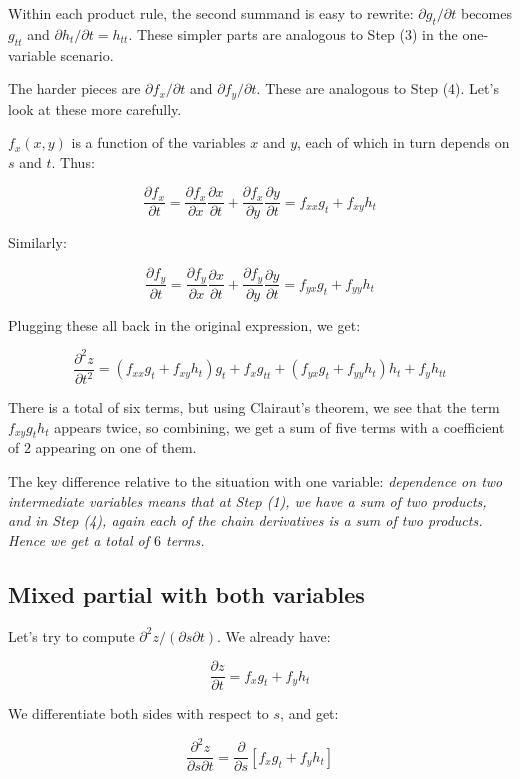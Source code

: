 \documentclass[10pt]{amsart}
\begin{document}
Within each product rule, the second summand is easy to rewrite:
$\partial g_t/\partial t$ becomes $g_{tt}$ and $\partial h_t/\partial
t = h_{tt}$. These simpler parts are analogous to Step (3) in the
one-variable scenario.

The harder pieces are $\partial f_x/\partial t$ and $\partial
f_y/\partial t$. These are analogous to Step (4). Let's look at these
more carefully.

$f_x(x,y)$ is a function of the variables $x$ and $y$, each of which
in turn depends on $s$ and $t$. Thus:

$$\frac{\partial f_x}{\partial t} = \frac{\partial f_x}{\partial x}\frac{\partial x}{\partial t} + \frac{\partial f_x}{\partial y} \frac{\partial y}{\partial t} = f_{xx}g_t + f_{xy}h_t$$

Similarly:

$$\frac{\partial f_y}{\partial t} = \frac{\partial f_y}{\partial x}\frac{\partial x}{\partial t} + \frac{\partial f_y}{\partial y}\frac{\partial y}{\partial t} = f_{yx}g_t + f_{yy}h_t$$

Plugging these all back in the original expression, we get:

$$\frac{\partial^2z}{\partial t^2} = (f_{xx}g_t + f_{xy}h_t)g_t + f_xg_{tt} + (f_{yx}g_t + f_{yy}h_t)h_t + f_yh_{tt}$$

There is a total of six terms, but using Clairaut's theorem, we see
that the term $f_{xy}g_th_t$ appears twice, so combining, we get a sum
of five terms with a coefficient of $2$ appearing on one of them.

The key difference relative to the situation with one variable: {\em
dependence on two intermediate variables means that at Step (1), we
have a sum of two products, and in Step (4), again each of the chain
derivatives is a sum of two products. Hence we get a total of $6$
terms.}

\subsection*{Mixed partial with both variables}

Let's try to compute $\partial^2 z/(\partial s\partial t)$. We already have:

$$\frac{\partial z}{\partial t} = f_xg_t + f_yh_t$$

We differentiate both sides with respect to $s$, and get:

$$\frac{\partial^2z}{\partial s \partial t} = \frac{\partial}{\partial s}[f_xg_t + f_yh_t]$$
\end{document}
